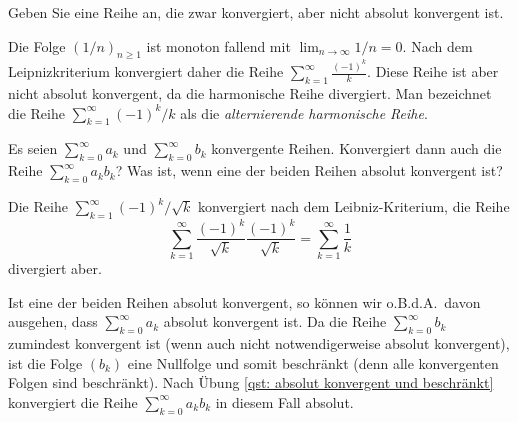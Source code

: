 \documentclass[a4paper,10pt]{article}
\begin{document}
\begin{question}
 Geben Sie eine Reihe an, die zwar konvergiert, aber nicht absolut konvergent ist.
\end{question}
\begin{solution}
 Die Folge $(1/n)_{n \geq 1}$ ist monoton fallend mit $\lim_{n \to \infty} 1/n = 0$. Nach dem Leipnizkriterium konvergiert daher die Reihe $\sum_{k=1}^\infty \frac{(-1)^k}{k}$. Diese Reihe ist aber nicht absolut konvergent, da die harmonische Reihe divergiert. Man bezeichnet die Reihe $\sum_{k=1}^\infty (-1)^k/k$ als die \emph{alternierende harmonische Reihe}.
\end{solution}


\begin{question}
 Es seien $\sum_{k=0}^\infty a_k$ und $\sum_{k=0}^\infty b_k$ konvergente Reihen. Konvergiert dann auch die Reihe $\sum_{k=0}^\infty a_k b_k$? Was ist, wenn eine der beiden Reihen absolut konvergent ist?
\end{question}
\begin{solution}
 Die Reihe $\sum_{k=1}^\infty (-1)^k/\sqrt{k}$ konvergiert nach dem Leibniz-Kriterium, die Reihe
 \[
  \sum_{k=1}^\infty \frac{(-1)^k}{\sqrt{k}} \frac{(-1)^k}{\sqrt{k}}
  = \sum_{k=1}^\infty \frac{1}{k}
 \]
 divergiert aber.
 
 Ist eine der beiden Reihen absolut konvergent, so können wir o.B.d.A.\ davon ausgehen, dass $\sum_{k=0}^\infty a_k$ absolut konvergent ist. Da die Reihe $\sum_{k=0}^\infty b_k$ zumindest konvergent ist (wenn auch nicht notwendigerweise absolut konvergent), ist die Folge $(b_k)$ eine Nullfolge und somit beschränkt (denn alle konvergenten Folgen sind beschränkt). Nach Übung \ref{qst: absolut konvergent und beschränkt} konvergiert die Reihe $\sum_{k=0}^\infty a_k b_k$ in diesem Fall absolut.
\end{solution}
\end{document}
